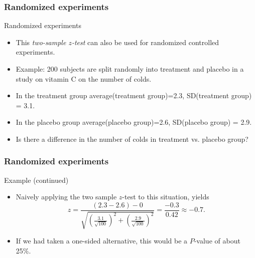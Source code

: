 \documentclass[handout]{beamer}
\begin{document}

   \begin{frame} \frametitle{Randomized experiments}

   \begin{block}
   {Randomized experiments}
   \begin{itemize}
   \item This {\em two-sample $z$-test} can also be used
   for randomized controlled experiments.

   \item Example:  200 subjects are split randomly into treatment
   and placebo in a study on vitamin C on the number of colds.

   \item In the treatment group average(treatment group)=2.3,
   SD(treatment group) = 3.1.

   \item In the placebo group average(placebo group)=2.6,
   SD(placebo group) = 2.9.

   \item Is there a difference in the number of colds in treatment
   vs. placebo group?


   \end{itemize}
   \end{block}
   \end{frame}


   \begin{frame} \frametitle{Randomized experiments}

   \begin{block}
   {Example (continued)}
   \begin{itemize}
   \item Naively applying the two sample
   $z$-test to this situation, yields
   $$
   z = \frac{(2.3 - 2.6) - 0}{\sqrt{\left(\frac{3.1}{\sqrt{100}}\right)^2 + \left(\frac{2.9}{\sqrt{100}}\right)^2}} = \frac{-0.3}{0.42} \approx -0.7.
   $$


   \item If we had taken a one-sided alternative, this would be a $P$-value of about 25\%.

   \end{itemize}
   \end{block}
   \end{frame}
\end{document}
